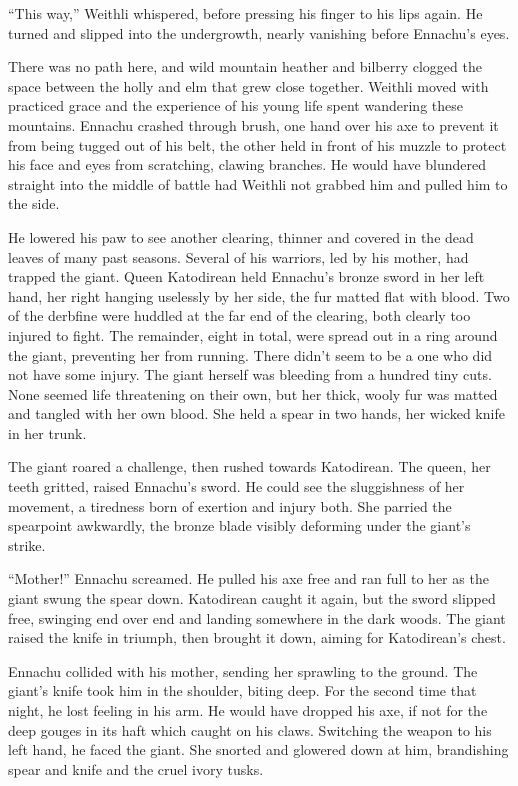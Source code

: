 ``This way,'' Weithli whispered, before pressing his finger to his lips again. He turned and slipped into the undergrowth, nearly vanishing before Ennachu's eyes.

There was no path here, and wild mountain heather and bilberry clogged the space between the holly and elm that grew close together. Weithli moved with practiced grace and the experience of his young life spent wandering these mountains. Ennachu crashed through brush, one hand over his axe to prevent it from being tugged out of his belt, the other held in front of his muzzle to protect his face and eyes from scratching, clawing branches. He would have blundered straight into the middle of battle had Weithli not grabbed him and pulled him to the side.

He lowered his paw to see another clearing, thinner and covered in the dead leaves of many past seasons. Several of his warriors, led by his mother, had trapped the giant. Queen Katodirean held Ennachu's bronze sword in her left hand, her right hanging uselessly by her side, the fur matted flat with blood. Two of the derbfine were huddled at the far end of the clearing, both clearly too injured to fight. The remainder, eight in total, were spread out in a ring around the giant, preventing her from running. There didn't seem to be a one who did not have some injury. The giant herself was bleeding from a hundred tiny cuts. None seemed life threatening on their own, but her thick, wooly fur was matted and tangled with her own blood. She held a spear in two hands, her wicked knife in her trunk.

The giant roared a challenge, then rushed towards Katodirean. The queen, her teeth gritted, raised Ennachu's sword. He could see the sluggishness of her movement, a tiredness born of exertion and injury both. She parried the spearpoint awkwardly, the bronze blade visibly deforming under the giant's strike.

``Mother!'' Ennachu screamed. He pulled his axe free and ran full to her as the giant swung the spear down. Katodirean caught it again, but the sword slipped free, swinging end over end and landing somewhere in the dark woods. The giant raised the knife in triumph, then brought it down, aiming for Katodirean's chest.

Ennachu collided with his mother, sending her sprawling to the ground. The giant's knife took him in the shoulder, biting deep. For the second time that night, he lost feeling in his arm. He would have dropped his axe, if not for the deep gouges in its haft which caught on his claws. Switching the weapon to his left hand, he faced the giant. She snorted and glowered down at him, brandishing spear and knife and the cruel ivory tusks.

